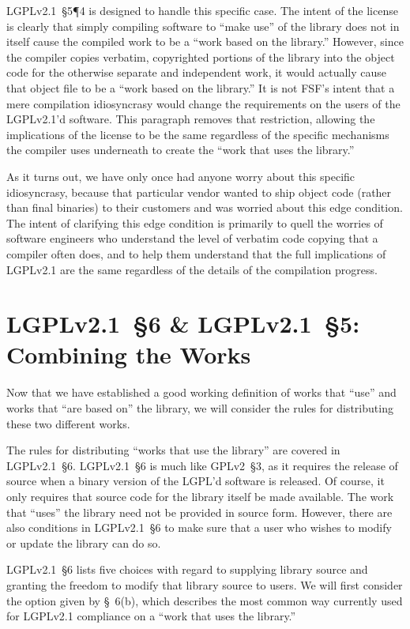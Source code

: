 LGPLv2.1~\S5\P4 is designed to handle this specific case. The intent of
the license is clearly that simply compiling software to ``make use'' of
the library does not in itself cause the compiled work to be a ``work
based on the library.''  However, since the compiler copies verbatim,
copyrighted portions of the library into the object code for the otherwise
separate and independent work, it would actually cause that object file to be a
``work based on the library.''  It is not FSF's intent that a mere
compilation idiosyncrasy would change the requirements on the users of the
LGPLv2.1'd software. This paragraph removes that restriction, allowing the
implications of the license to be the same regardless of the specific
mechanisms the compiler uses underneath to create the ``work that uses the
library.''

As it turns out, we have only once had anyone worry about this specific
idiosyncrasy, because that particular vendor wanted to ship object code
(rather than final binaries) to their customers and was worried about
this edge condition. The intent of clarifying this edge condition is
primarily to quell the worries of software engineers who understand the
level of verbatim code copying that a compiler often does, and to help
them understand that the full implications of LGPLv2.1 are the same regardless
of the details of the compilation progress.

\section{LGPLv2.1~\S6 \& LGPLv2.1~\S5: Combining the Works}
\label{lgpl-section-6}
Now that we have established a good working definition of works that
``use'' and works that ``are based on'' the library, we will consider the
rules for distributing these two different works.

The rules for distributing ``works that use the library'' are covered in
LGPLv2.1~\S6\@. LGPLv2.1~\S6 is much like GPLv2~\S3, as it requires the release
of source when a binary version of the LGPL'd software is released. Of
course, it only requires that source code for the library itself be made
available. The work that ``uses'' the library need not be provided in
source form. However, there are also conditions in LGPLv2.1~\S6 to make sure
that a user who wishes to modify or update the library can do so.

LGPLv2.1~\S6 lists five choices with regard to supplying library source
and granting the freedom to modify that library source to users. We
will first consider the option given by \S~6(b), which describes the
most common way currently used for LGPLv2.1 compliance on a ``work that
uses the library.''

